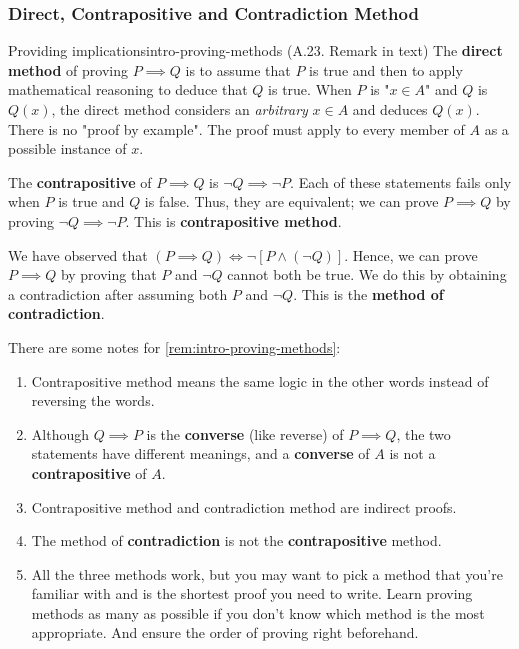 \documentclass[../src/handouts/main.tex]{subfiles}
\begin{document}
\subsubsection{Direct, Contrapositive and Contradiction Method}

\begin{remark}{Providing implications}{intro-proving-methods}
  (A.23. Remark in text)
  The \textbf{direct method} of proving $P \implies Q$ is to assume that $P$ is true and then to apply mathematical reasoning to deduce that $Q$ is true.
  When $P$ is "$x \in A$" and $Q$ is $Q(x)$, the direct method considers an \textit{arbitrary} $x \in A$ and deduces $Q(x)$.
  There is no "proof by example".
  The proof must apply to every member of $A$ as a possible instance of $x$.

  The \textbf{contrapositive} of $P \implies Q$ is $\neg Q \implies \neg P$. Each of these statements fails only when $P$ is true and $Q$ is false. Thus, they are equivalent; we can prove $P \implies Q$ by proving $\neg Q \implies \neg P$. This is \textbf{contrapositive method}.

  We have observed that $(P \implies Q) \iff \neg \left[ P \land (\neg Q) \right]$.
  Hence, we can prove $P \implies Q$ by proving that $P$ and $\neg Q$ cannot both be true.
  We do this by obtaining a contradiction after assuming both $P$ and $\neg Q$.
  This is the \textbf{method of contradiction}.
\end{remark}

There are some notes for \cref{rem:intro-proving-methods}:
\begin{enumerate}
  \item Contrapositive method means the same logic in the other words instead of reversing the words.
  \item Although $Q \implies P$ is the \textbf{converse} (like reverse) of $P \implies Q$, the two statements have different meanings, and a \textbf{converse} of $A$ is not a \textbf{contrapositive} of $A$.
  \item Contrapositive method and contradiction method are indirect proofs.
  \item The method of \textbf{contradiction} is not the \textbf{contrapositive} method.
  \item All the three methods work, but you may want to pick a method that you're familiar with and is the shortest proof you need to write. Learn proving methods as many as possible if you don't know which method is the most appropriate. And ensure the order of proving right beforehand.
\end{enumerate}
\end{document}

